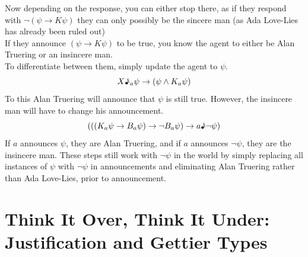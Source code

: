 \documentclass[12pt, titlepage, twoside, a4paper]{report}
\begin{document}
{Now depending on the response, you can either stop there, as if they respond with $\neg (\psi \to K\psi)$ they can only possibly be the sincere man (as Ada Love-Lies has already been ruled out)\\
If they announce $(\psi \to K\psi)$ to be true, you know the agent to either be Alan Truering or an insincere man.\\
To differentiate between them, simply update the agent to $\psi$.
$$X\text{\textmusicalnote}_a \psi \to (\psi \wedge K_a \psi)$$
To this Alan Truering will announce that $\psi$ is still true. However, the insincere man will have to change his announcement.
$$(((K_a \psi \to B_a \psi ) \to \neg B_a \psi) \to a \text{\textmusicalnote} \neg \psi)$$
If $a$ announces $\psi$, they are Alan Truering, and if $a$ announces $\neg \psi$, they are the insincere man. These steps still work with $\neg \psi$ in the world by simply replacing all instances of $\psi$ with $\neg \psi$ in announcements and eliminating Alan Truering rather than Ada Love-Lies, prior to announcement.

\chapter{Think It Over, Think It Under: Justification and Gettier Types}
}
\end{document}
